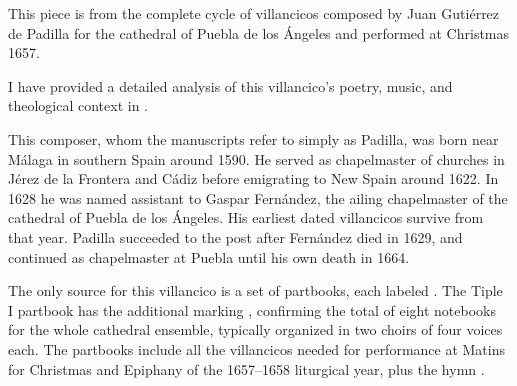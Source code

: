 
\begin{notesources}

    \begin{source}
    \end{source}

    \begin{source}
    \end{source}

\end{notesources}

This piece is from the complete cycle of villancicos composed by Juan Gutiérrez 
de Padilla for the cathedral of Puebla de los Ángeles and performed at 
Christmas 1657.%
\begin{Footnote}
    I have provided a detailed analysis of this villancico's poetry, music, and
    theological context in \autocite[133--226]{Cashner:PhD}.
\end{Footnote}
This composer, whom the manuscripts refer to simply as Padilla, was born near
Málaga in southern Spain around 1590.%
    \Autocites{Mauleon:PadillaPalafox}{Hurtado:Padilla}{Stevenson:Padilla}
He served as chapelmaster of churches in Jérez de la Frontera and Cádiz before
emigrating to New Spain around 1622.
In 1628 he was named assistant to Gaspar Fernández, the ailing chapelmaster of
the cathedral of Puebla de los Ángeles.
His earliest dated villancicos survive from that year.%
    \Autocite{Cashner:Cards}
Padilla succeeded to the post after Fernández died in 1629, and continued as
chapelmaster at Puebla until his own death in 1664.

The only source for this villancico is a set of partbooks, each labeled
.
  \Autocites{Puebla:Microfilm}{Stanford:Catalog}
The Tiple I partbook has the additional marking , 
confirming the total of eight notebooks for the whole cathedral ensemble, 
typically organized in two choirs of four voices each.
The partbooks include all the villancicos needed for performance at Matins for 
Christmas and Epiphany of the 1657--1658 liturgical year, plus the hymn 
.

